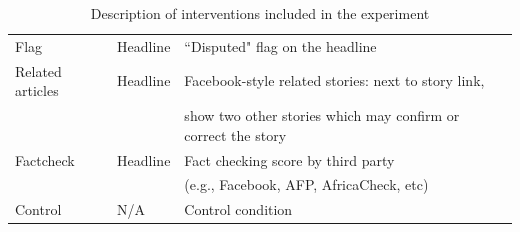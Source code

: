 \documentclass[letterpaper, 12pt, parskip=full,DIV=12]{scrartcl}
\begin{document}
\begin{table}[htb!]
\begin{tabular}{l|l|l}
\\
Flag                                                                                                           & Headline                                                                                                     &  ``Disputed" flag on the headline                                                                                                                                                                                                                                                                                                                                                     \\
Related articles                                                                                                       & Headline                                                                                                     & Facebook-style related stories: next to story link,\\ & & show two other stories which may confirm or correct the story                                                                                                                                                                                                                                                                                               \\
Factcheck                                                                                                      & Headline                                                                                                     & Fact checking score by third party\\ & & (e.g., Facebook, AFP, AfricaCheck, etc)
 \\
Control                                                                                                        & N/A                                                                                                          & Control condition                                                                                                                                                                                                                                                                                                                                                                                              
\end{tabular}
\caption{Description of interventions included in the experiment}
\label{tab:treatments}
\end{table}
\end{document}
